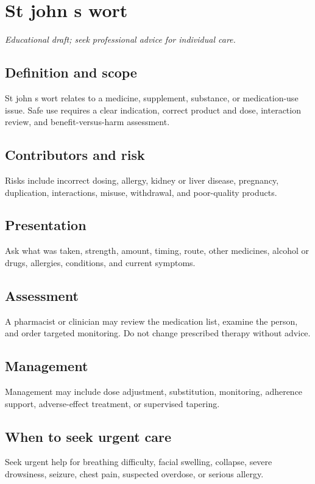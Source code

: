 \chapter{St john s wort}
\medskip
\noindent\textit{Educational draft; seek professional advice for individual care.}

\section*{Definition and scope}
St john s wort relates to a medicine, supplement, substance, or medication-use issue. Safe use requires a clear indication, correct product and dose, interaction review, and benefit-versus-harm assessment.

\section*{Contributors and risk}
Risks include incorrect dosing, allergy, kidney or liver disease, pregnancy, duplication, interactions, misuse, withdrawal, and poor-quality products.

\section*{Presentation}
Ask what was taken, strength, amount, timing, route, other medicines, alcohol or drugs, allergies, conditions, and current symptoms.

\section*{Assessment}
A pharmacist or clinician may review the medication list, examine the person, and order targeted monitoring. Do not change prescribed therapy without advice.

\section*{Management}
Management may include dose adjustment, substitution, monitoring, adherence support, adverse-effect treatment, or supervised tapering.

\section*{When to seek urgent care}
Seek urgent help for breathing difficulty, facial swelling, collapse, severe drowsiness, seizure, chest pain, suspected overdose, or serious allergy.

